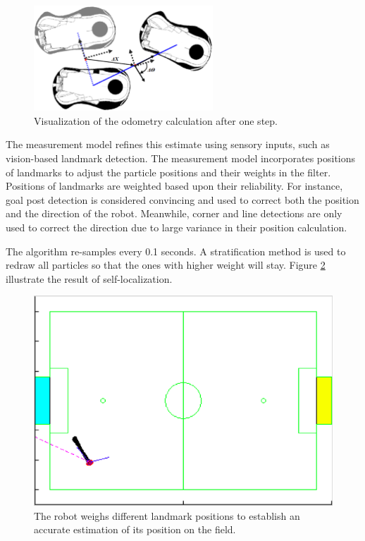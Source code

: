 \documentclass{article}
\begin{document}
	\begin{figure}[H]
		\centering
		\includegraphics[width=0.6\textwidth]{figures/Odometry.eps}
		\caption{Visualization of the odometry calculation after one step.}
		\label{fig:odometry}
	\end{figure}

	The measurement model refines this estimate using sensory inputs, such as vision-based landmark detection.  The measurement model incorporates positions of landmarks to adjust the particle positions and their weights in the filter. Positions of landmarks are weighted based upon their reliability. For instance, goal post detection is considered convincing and used to correct both the position and the direction of the robot. Meanwhile, corner and line detections are only used to correct the direction due to large variance in their position calculation.

	The algorithm re-samples every 0.1 seconds. A stratification method is used to redraw all  particles so that the ones with higher weight will stay. Figure \ref{fig:particlesafter} illustrate the result of self-localization.

	\begin{figure}[H]
		\centering
		\includegraphics[width=.6\textwidth]{figures/FocusedParticles.eps}
	  	\caption{The robot weighs different landmark positions to establish an accurate estimation of its position on the field.}
		\label{fig:particlesafter}
  	\end{figure}
\end{document}
